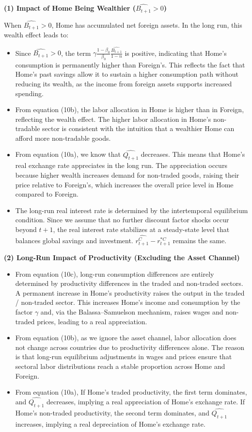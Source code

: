 \documentclass[a4paper,12pt]{article} %
\theoremstyle{nonitalic}
\begin{document}
\textbf{(1) Impact of Home Being Wealthier (\( \widehat{B_{t+1}} > 0 \))}

When \( \widehat{B_{t+1}} > 0 \), Home has accumulated net foreign assets. In the long run, this wealth effect leads to:
\begin{itemize}
    \item Since $\widehat{B_{t+1}} > 0$, the term $\gamma \frac{1-\beta_0}{\beta_0} \frac{\widehat{B_{t+1}}}{1-n}$ is positive, indicating that Home’s consumption is permanently higher than Foreign’s. This reflects the fact that Home’s past savings allow it to sustain a higher consumption path without reducing its wealth, as the income from foreign assets supports increased spending.
    \item From equation (10b), the labor allocation in Home is higher than in Foreign, reflecting the wealth effect. The higher labor allocation in Home’s non-tradable sector is consistent with the intuition that a wealthier Home can afford more non-tradable goods.
    \item From equation (10a), we know that $\widehat{Q_{t+1}}$ decreases. This means that Home’s real exchange rate appreciates in the long run. The appreciation occurs because higher wealth increases demand for non-traded goods, raising their price relative to Foreign’s, which increases the overall price level in Home compared to Foreign.
    \item The long-run real interest rate is determined by the intertemporal equilibrium condition. Since we assume that no further discount factor shocks occur beyond $t+1$, the real interest rate stabilizes at a steady-state level that balances global savings and investment. $\widehat{r_{t+1}^C} - \widehat{r_{t+1}^{*C}}$ remains the same.
\end{itemize}

\textbf{(2) Long-Run Impact of Productivity (Excluding the Asset Channel)}
\begin{itemize}
    \item From equation (10c), long-run consumption differences are entirely determined by productivity differences in the traded and non-traded sectors.
    A permanent increase in Home’s productivity raises the output in the traded / non-traded sector. This increases Home's income and consumption by the factor \( \gamma \) and, via the Balassa--Samuelson mechanism, raises wages and non-traded prices, leading to a real appreciation.
    \item From equation (10b), as we ignore the asset channel,  labor allocation does not change across countries due to productivity differences alone. The reason is that long-run equilibrium adjustments in wages and prices ensure that sectoral labor distributions reach a stable proportion across Home and Foreign.
    \item From equation (10a), If Home’s traded productivity, the first term dominates, and $\widehat{Q_{t+1}}$ decreases, implying a real appreciation of Home’s exchange rate.
    If Home’s non-traded productivity, the second term dominates, and $\widehat{Q_{t+1} }$ increases, implying a real depreciation of Home’s exchange rate.
\end{itemize}
\end{document}
